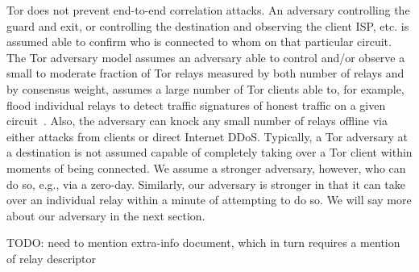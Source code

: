 Tor does not prevent end-to-end correlation attacks. An adversary
controlling the guard and exit, or controlling the destination and
observing the client ISP, etc. is assumed able to confirm who is
connected to whom on that particular circuit. The Tor adversary model
assumes an adversary able to control and/or observe a small to
moderate fraction of Tor relays measured by both number of relays and
by consensus weight, assumes a large number of Tor clients able to,
for example, flood individual relays to detect traffic signatures of
honest traffic on a given circuit~\cite{long-paths}. Also, the
adversary can knock any small number of relays offline via either
attacks from clients or direct Internet DDoS\@. Typically, a
Tor adversary at a destination is not assumed capable of completely
taking over a Tor client within moments of being connected. We
assume a stronger adversary, however, who can do so, e.g., via a zero-day.
Similarly, our adversary is stronger in that it can take over
an individual relay within a minute of attempting to do so. We will say
more about our adversary in the next section.

TODO: need to mention extra-info document, which in turn requires a mention of
relay descriptor

